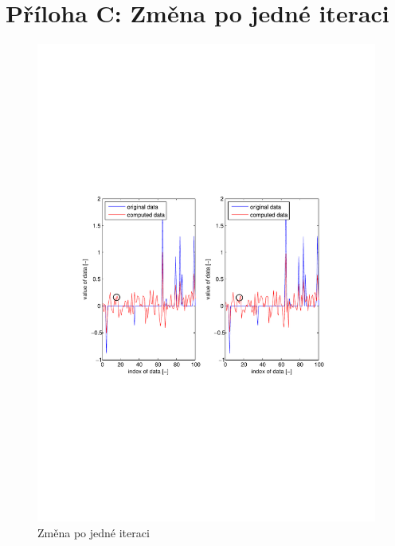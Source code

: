 \documentclass[FM,BP]{tulthesis}
\begin{document}
\section*{Příloha C: Změna po jedné iteraci}
\begin{figure}[!ht]
	\begin{center}
		\includegraphics[scale=1]{obr/diff1.pdf}
		\end{center}
		\caption{Změna po jedné iteraci}
		\label{fig:diff1}
		\end{figure}
\newpage
{}
\end{document}
